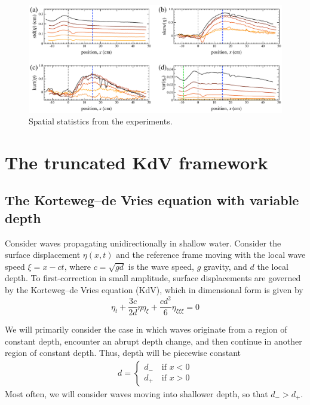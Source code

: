 \documentclass[11pt]{article}
\newcommand{\depth}{d}
\newcommand{\dup}{\depth_{-}}
\newcommand{\ddn}{\depth_{+}}
\begin{document}
\begin{figure}%
\begin{center}
\includegraphics[width = 0.85 \linewidth]{Figs/fig4.pdf}
\caption{
Spatial statistics from the experiments.
}
\label{fig4}
\end{center}
\end{figure}
 
\section{The truncated KdV framework}

\subsection{The Korteweg–de Vries equation with variable depth}
Consider waves propagating unidirectionally in shallow water. Consider the surface displacement $\eta(x,t)$ and the reference frame moving with the local wave speed $\xi = x - ct$, where $c = \sqrt{g \depth}$ is the wave speed, $g$ gravity, and $\depth$ the local depth.
To first-correction in small amplitude, surface displacements are governed by the Korteweg–de Vries equation (KdV), which in dimensional form is given by \cite{whitham2011linear}
\begin{equation}
\label{KdV}
\eta_t + \frac{3 c}{2 \depth} \eta \eta_{\xi} + \frac{c \depth^2}{6} \eta_{\xi \xi \xi} = 0
\end{equation}

We will primarily consider the case in which waves originate from a region of constant depth, encounter an abrupt depth change, and then continue in another region of constant depth. Thus, depth will be piecewise constant
\begin{align}
\depth = 
\begin{cases}
\dup \quad \mbox{if } x<0 \\
\ddn \quad \mbox{if } x>0
\end{cases}
\end{align}
Most often, we will consider waves moving into shallower depth, so that $\dup > \ddn$. 
\end{document}
